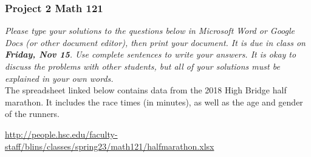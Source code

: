 \documentclass[12pt]{exam}
\begin{document}
\subsubsection*{Project 2 \hfill Math 121}

\textit{Please type your solutions to the questions below in Microsoft Word or Google Docs (or other document editor), then print your document. It is due in class on \textbf{Friday, Nov 15}. Use complete sentences to write your answers. It is okay to discuss the problems with other students, but all of your solutions must be explained in your own words. } \\

\noindent
The spreadsheet linked below contains data from the 2018 High Bridge half marathon. It includes the race times (in minutes), as well as the age and gender of the runners.   


\begin{center}
\url{http://people.hsc.edu/faculty-staff/blins/classes/spring23/math121/halfmarathon.xlsx}  
\end{center}
\end{document}
